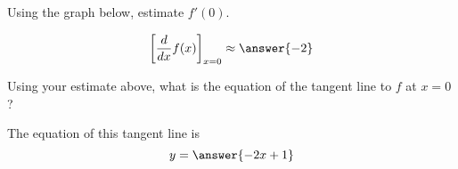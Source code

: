 \documentclass{ximera}
\author{Steven Gubkin}
\begin{document}
\begin{exercise}


Using the graph below, estimate   $ f'(0)$.

\begin{prompt}
$$\bigg[ \frac{d}{dx} f(x) \bigg]_{x = 0} \approx \answer{-2}$$
\end{prompt}









Using your estimate above, what is the equation of the tangent line to $f$ at $x=0$?

\begin{prompt} 
The equation of this tangent line is
$$ y = \answer{-2x+1}$$ 
\end{prompt}

\end{exercise}
\end{document}
